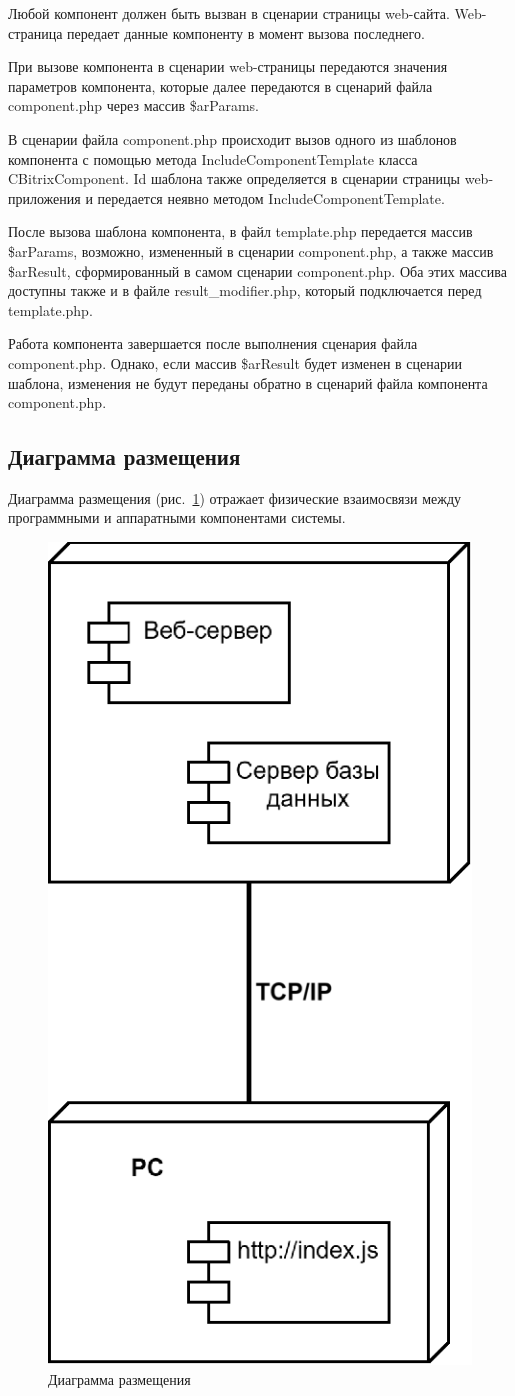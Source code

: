 Любой компонент должен быть вызван в сценарии страницы web-сайта. Web-страница передает данные компоненту в момент вызова последнего.

При вызове компонента в сценарии web-страницы передаются значения параметров компонента, которые далее передаются в сценарий файла component.php через массив \$arParams.

В сценарии файла component.php происходит вызов одного из шаблонов компонента с помощью метода IncludeComponentTemplate класса CBitrixComponent. Id шаблона также определяется в сценарии страницы web-приложения и передается неявно методом IncludeComponentTemplate.

После вызова шаблона компонента, в файл template.php передается массив \$arParams, возможно, измененный в сценарии component.php, а также массив \$arResult, сформированный в самом сценарии component.php. Оба этих массива доступны также и в файле result\_modifier.php, который подключается перед template.php.

Работа компонента завершается после выполнения сценария файла component.php. Однако, если массив \$arResult будет изменен в сценарии шаблона, изменения не будут переданы обратно в сценарий файла компонента component.php.

\subsection{Диаграмма размещения}

Диаграмма размещения (рис.~\ref{fig:razm}) отражает физические взаимосвязи между программными и аппаратными компонентами системы.

\vspace{-8mm} %
\begin{figure}
	\centering
	\includegraphics[width=0.5\linewidth]{images/razm}
	\caption{Диаграмма размещения}
	\label{fig:razm}
\end{figure}


